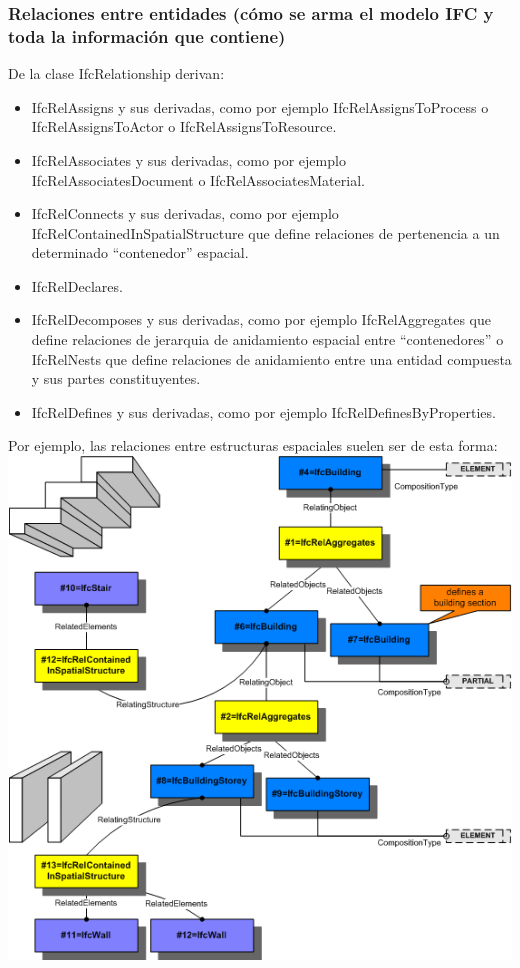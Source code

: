 \documentclass[spanish,10pt,a4paper,final,oneside]{article}
\begin{document}
\newpage
\subsubsection{Relaciones entre entidades (cómo se arma el modelo IFC y toda la información que contiene)}
De la clase IfcRelationship derivan:
\begin{itemize}
\item IfcRelAssigns y sus derivadas, como por ejemplo IfcRelAssignsToProcess o IfcRelAssignsToActor o IfcRelAssignsToResource.

\item IfcRelAssociates y sus derivadas, como por ejemplo IfcRelAssociatesDocument o IfcRelAssociatesMaterial.

\item IfcRelConnects y sus derivadas, como por ejemplo IfcRelContainedInSpatialStructure que define relaciones de pertenencia a un determinado ``contenedor'' espacial.

\item IfcRelDeclares.

\item IfcRelDecomposes y sus derivadas, como por ejemplo IfcRelAggregates que define relaciones de jerarquia de anidamiento espacial entre ``contenedores'' o IfcRelNests que define relaciones de anidamiento entre una entidad compuesta y sus partes constituyentes.

\item IfcRelDefines y sus derivadas, como por ejemplo IfcRelDefinesByProperties.
\end{itemize}

\vspace{0.5cm}
Por ejemplo, las relaciones entre estructuras espaciales suelen ser de esta forma:
\vspace{0.3cm}
\\ \includegraphics[width=\textwidth]{ifcrelcontainedinspatialstructure-fig1}
\end{document}
